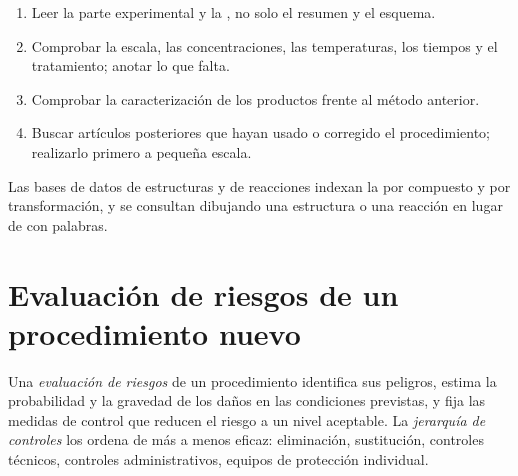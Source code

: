 \begin{method}\label{met:b3:lab-techniques-3:read-paper}
\begin{enumerate}
  \item Leer la parte experimental y la , no solo el
        resumen y el esquema.
  \item Comprobar la escala, las concentraciones, las temperaturas, los tiempos y el tratamiento; anotar
        lo que falta.
  \item Comprobar la caracterización de los productos frente al método anterior.
  \item Buscar artículos posteriores que hayan usado o corregido el procedimiento; realizarlo primero a
        pequeña escala.
\end{enumerate}
\end{method}

Las bases de datos de estructuras y de reacciones indexan la  por compuesto y
por transformación, y se consultan dibujando una estructura o una reacción
en lugar de con palabras.

\section{Evaluación de riesgos de un procedimiento nuevo}

\begin{definition}\label{def:b3:lab-techniques-3:assessment}
Una \emph{evaluación de riesgos} de un procedimiento identifica sus
peligros, estima la probabilidad y la gravedad de los daños en las condiciones previstas,
y fija las medidas de control que reducen el riesgo a un nivel aceptable. La
\emph{jerarquía de controles} los ordena de más a
menos eficaz: eliminación, sustitución, controles técnicos,
controles administrativos, equipos de protección individual.
\end{definition}

